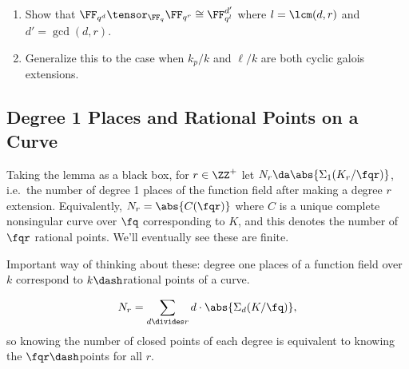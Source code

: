 \begin{exercise}[?]

\envlist

\begin{enumerate}
\def\labelenumi{\alph{enumi}.}
\item
  Show that \(\FF_{q^d} \tensor_{\FF_q} \FF_{q^r} \cong \FF_{q^l}^{d'}\)
  where \(l = \lcm(d, r)\) and \(d' = \gcd(d, r)\).
\item
  Generalize this to the case when \(k_p / k\) and \(\ell / k\) are both
  cyclic galois extensions.
\end{enumerate}

\end{exercise}

\hypertarget{degree-1-places-and-rational-points-on-a-curve}{%
\subsection{Degree 1 Places and Rational Points on a
Curve}\label{degree-1-places-and-rational-points-on-a-curve}}

Taking the lemma as a black box, for \(r\in \ZZ^+\) let
\(N_r \da \abs{\Sigma_1(K_r/ \fqr) }\), i.e.~the number of degree 1
places of the function field after making a degree \(r\) extension.
Equivalently, \(N_r = \abs{C(\fqr)}\) where \(C\) is a unique complete
nonsingular curve over \(\fq\) corresponding to \(K\), and this denotes
the number of \(\fqr\) rational points. We'll eventually see these are
finite.

\begin{remark}

Important way of thinking about these: degree one places of a function
field over \(k\) correspond to \(k\dash\)rational points of a curve.

\end{remark}

\begin{corollary}

\begin{align*}  
N_r = \sum_{d\divides r} d\cdot \abs{\Sigma_d(K/ \fq)}
,\end{align*} so knowing the number of closed points of each degree is
equivalent to knowing the \(\fqr\dash\)points for all \(r\).

\end{corollary}

